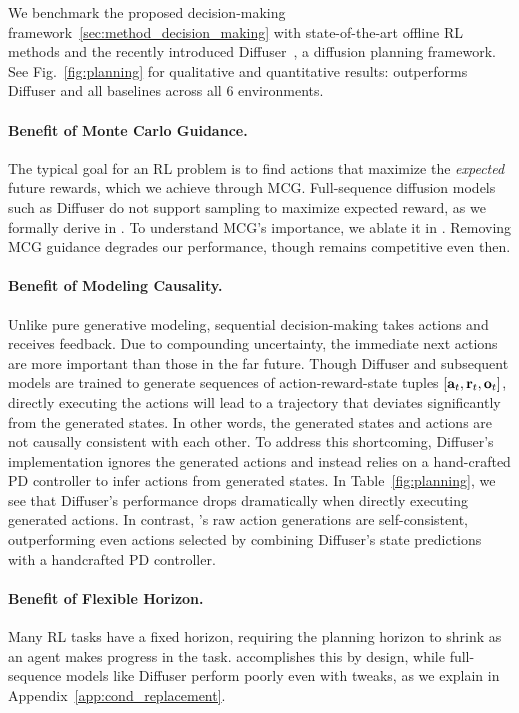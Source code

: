 We benchmark the proposed decision-making framework~\ref{sec:method_decision_making} with state-of-the-art offline RL methods and the recently introduced Diffuser~\cite{janner2022planning}, a diffusion planning framework. See Fig.~\ref{fig:planning} for qualitative and quantitative results: \algshort{} outperforms Diffuser and all baselines across all $6$ environments. 

\paragraph{Benefit of Monte Carlo Guidance.}
The typical goal for an RL problem is to find actions that maximize the \emph{expected} future rewards, which we achieve through MCG. Full-sequence diffusion models such as Diffuser do not support sampling to maximize expected reward, as we formally derive in . To understand MCG's importance, we ablate it in . Removing MCG guidance degrades our performance, though \algons{} remains competitive even then.

\paragraph{Benefit of Modeling Causality.}
Unlike pure generative modeling, sequential decision-making takes actions and receives feedback. Due to compounding uncertainty, the immediate next actions are more important than those in the far future.
Though Diffuser and subsequent models are trained to generate sequences of action-reward-state tuples $[\mathbf{a}_t, \mathbf{r}_t, \mathbf{o}_t]$, directly executing the actions will lead to a trajectory that deviates significantly from the generated states. In other words, the generated states and actions are not causally consistent with each other. To address this shortcoming, Diffuser's implementation ignores the generated actions and instead relies on a hand-crafted PD controller to infer actions from generated states. In Table~\ref{fig:planning}, we see that Diffuser's performance drops dramatically when directly executing generated actions. In contrast, \algons's raw action generations are self-consistent,  outperforming even actions selected by combining Diffuser's state predictions with a handcrafted PD controller.

\paragraph{Benefit of Flexible Horizon.}
Many RL tasks have a fixed horizon, requiring the planning horizon to shrink as an agent makes progress in the task. \algo{} accomplishes this by design, while full-sequence models like Diffuser perform poorly even with tweaks, as we explain in Appendix~\ref{app:cond_replacement}. 


